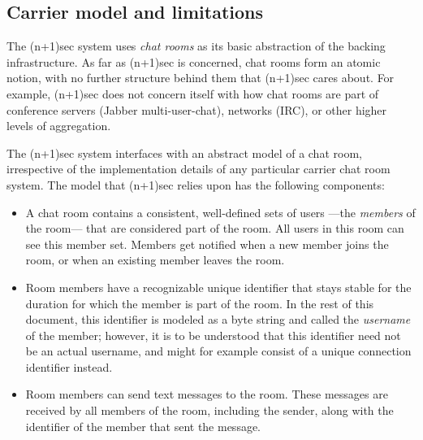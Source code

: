 \documentclass{article}
\begin{document}
\subsection{Carrier model and limitations}
\label{sec:carrier-chat-rooms/carrier-chat-room-model}

The (n+1)sec system uses \emph{chat rooms} as its basic abstraction of the backing infrastructure.
As far as (n+1)sec is concerned, chat rooms form an atomic notion, with no further structure behind them that (n+1)sec cares about.
For example, (n+1)sec does not concern itself with how chat rooms are part of conference servers (Jabber multi-user-chat), networks (IRC), or other higher levels of aggregation.

The (n+1)sec system interfaces with an abstract model of a chat room, irrespective of the implementation details of any particular carrier chat room system.
The model that (n+1)sec relies upon has the following components:
\begin{itemize}
\item A chat room contains a consistent, well-defined sets of users ---the \emph{members} of the room--- that are considered part of the room. All users in this room can see this member set. Members get notified when a new member joins the room, or when an existing member leaves the room.
\item Room members have a recognizable unique identifier that stays stable for the duration for which the member is part of the room. In the rest of this document, this identifier is modeled as a byte string and called the \emph{username} of the member; however, it is to be understood that this identifier need not be an actual username, and might for example consist of a unique connection identifier instead.
\item Room members can send text messages to the room. These messages are received by all members of the room, including the sender, along with the identifier of the member that sent the message.
\end{itemize}
\end{document}
